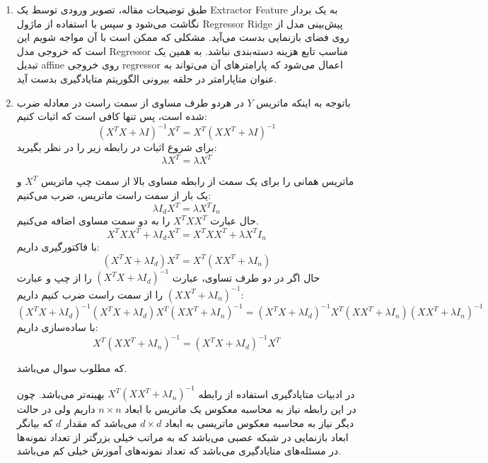 \documentclass{article}
\begin{document}
\begin{enumerate}
	\item
	
	طبق توضیحات مقاله،‌ تصویر ورودی توسط یک
	Extractor Feature
	به یک بردار نگاشت می‌شود و سپس با استفاده از ماژول
	Regressor Ridge
	پیش‌بینی مدل از روی فضای بازنمایی بدست می‌آید. مشکلی که ممکن است با آن مواجه شویم این است که خروجی مدل
	Regressor
	مناسب تابع هزینه دسته‌بندی نباشد. به همین یک تبدیل affine روی خروجی regressor اعمال می‌شود که پارامترهای آن می‌تواند به عنوان متاپارامتر در حلقه بیرونی الگوریتم متایادگیری بدست آید.
	
	\item
	باتوجه به اینکه ماتریس $Y$ در هردو طرف مساوی از سمت راست در معادله ضرب شده است،‌ پس تنها کافی است که اثبات کنیم:
	$$
	{\left( {{X^T}X + \lambda I} \right)^{ - 1}}{X^T} = {X^T}{\left( {X{X^T} + \lambda I} \right)^{ - 1}}
	$$
	برای شروع اثبات در رابطه زیر را در نظر بگیرید:
	$$
	\lambda {X^T} = \lambda {X^T}
	$$
	
	ماتریس همانی را برای یک سمت از رابطه مساوی بالا از سمت چپ ماتریس 
	${X^T}$
	و یک بار از سمت راست ماتریس،‌ ضرب می‌کنیم:
	$$
	\lambda {I_d}{X^T} = \lambda {X^T}{I_n}
	$$
	حال عبارت
	${X^T}X{X^T}$
	را به دو سمت مساوی اضافه می‌کنیم.
	$$
	{X^T}X{X^T} + \lambda {I_d}{X^T} = {X^T}X{X^T} + \lambda {X^T}{I_n}
	$$
	با فاکتورگیری داریم:
	$$
	\left( {{X^T}X + \lambda {I_d}} \right){X^T} = {X^T}\left( {X{X^T} + \lambda {I_n}} \right)
	$$
	حال اگر در دو طرف تساوی، عبارت
	${\left( {{X^T}X + \lambda {I_d}} \right)^{ - 1}}$
	را از چپ و عبارت
	${\left( {X{X^T} + \lambda {I_n}} \right)^{ - 1}}$
	را از سمت راست ضرب کنیم داریم:
	$$
	{\left( {{X^T}X + \lambda {I_d}} \right)^{ - 1}}\left( {{X^T}X + \lambda {I_d}} \right){X^T}{\left( {X{X^T} + \lambda {I_n}} \right)^{ - 1}} = {\left( {{X^T}X + \lambda {I_d}} \right)^{ - 1}}{X^T}\left( {X{X^T} + \lambda {I_n}} \right){\left( {X{X^T} + \lambda {I_n}} \right)^{ - 1}}
	$$
	با ساده‌سازی داریم:
	$$
	{X^T}{\left( {X{X^T} + \lambda {I_n}} \right)^{ - 1}} = {\left( {{X^T}X + \lambda {I_d}} \right)^{ - 1}}{X^T}
	$$
	
	که مطلوب سوال می‌باشد.
	
	در ادبیات متایادگیری استفاده از رابطه
	${X^T}{\left( {X{X^T} + \lambda {I_n}} \right)^{ - 1}}$
	بهینه‌تر می‌باشد. چون در این رابطه نیاز به محاسبه معکوس یک ماتریس با ابعاد
	$n \times n$
	داریم ولی در حالت دیگر نیاز به محاسبه معکوس ماتریسی به ابعاد
	$d \times d$
	می‌باشد که مقدار $d$ که بیانگر ابعاد بازنمایی در شبکه عصبی می‌باشد که به مراتب خیلی بزرگتر از تعداد نمونه‌ها در مسئله‌های متایادگیری می‌باشد که تعداد نمونه‌های آموزش خیلی کم می‌باشد.
	

\end{enumerate}
\end{document}
